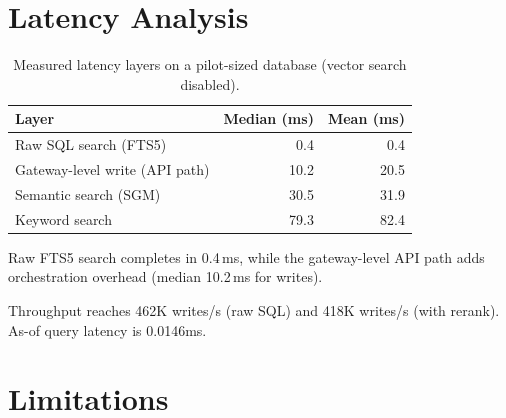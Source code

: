 \documentclass{llncs}
\begin{document}
\section{Latency Analysis}


\begin{table}[h]
\centering
\caption{Measured latency layers on a pilot-sized database (vector search disabled).}
\begin{tabular}{lrr}
\toprule
Layer & Median (ms) & Mean (ms) \\
\midrule
Raw SQL search (FTS5) & 0.4 & 0.4 \\
Gateway-level write (API path) & 10.2 & 20.5 \\
Semantic search (SGM) & 30.5 & 31.9 \\
Keyword search & 79.3 & 82.4 \\
\bottomrule
\end{tabular}
\end{table}

Raw FTS5 search completes in 0.4\,ms, while the gateway-level API path adds orchestration overhead (median 10.2\,ms for writes).

Throughput reaches 462K writes/s (raw SQL) and 418K writes/s (with rerank). As-of query latency is 0.0146ms.

\section{Limitations}
\label{sec:limitations}
\end{document}
